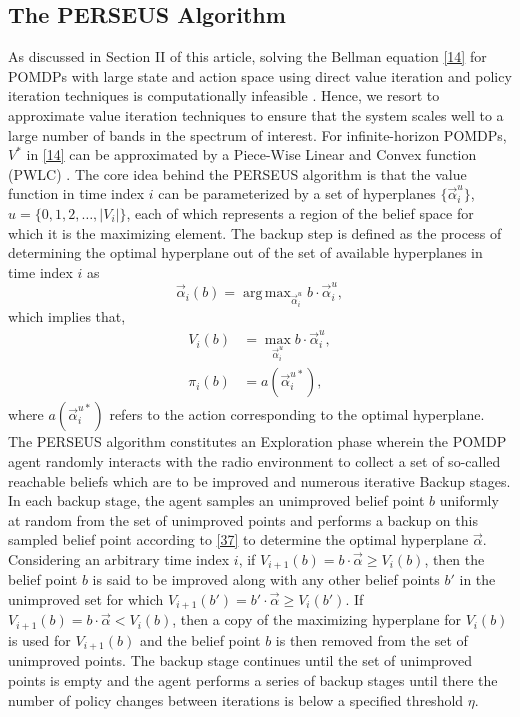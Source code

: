 \documentclass[10pt,twocolumn]{IEEEtran}
\newcommand{\bk}[1]{{\color{red}{[BK: #1]}}}
\DeclareMathOperator*{\argmax}{arg\,max}
\begin{document}
\subsection{The PERSEUS Algorithm}
As discussed in Section II of this article, solving the Bellman equation \eqref{14} for POMDPs with large state and action space using direct value iteration and policy iteration techniques is computationally infeasible \bk{citation}. Hence, we resort to approximate value iteration techniques \bk{citation} to ensure that the system scales well to a large number of bands in the spectrum of interest. For infinite-horizon POMDPs, $V^*$ in \eqref{14} can be approximated by a Piece-Wise Linear and Convex function (PWLC) \bk{citation}. The core idea behind the PERSEUS algorithm is that the value function in time index $i$ can be parameterized by a set of hyperplanes $\{\vec{\alpha}_i^{u}\}$, $u = \{0,1,2,\dots,|V_i|\}$, each of which represents a region of the belief space for which it is the maximizing element. The backup step is defined as the process of determining the optimal hyperplane out of the set of available hyperplanes in time index $i$ as
\begin{equation}\label{37}
    \vec{\alpha}_{i}(b) = \argmax_{\vec{\alpha}_{i}^u} b \cdot \vec{\alpha}_{i}^u,
\end{equation}
which implies that,
\begin{equation}\label{38}
    \begin{split}
        V_i(b) &= \max_{\vec{\alpha}_{i}^u} b \cdot \vec{\alpha}_{i}^u,\\
        \pi_i(b) &= a(\vec{\alpha}_i^{u*}),
    \end{split}
\end{equation}
where $a(\vec{\alpha}_i^{u*})$ refers to the action corresponding to the optimal hyperplane. The PERSEUS algorithm constitutes an Exploration phase wherein the POMDP agent randomly interacts with the radio environment to collect a set of so-called reachable beliefs which are to be improved and numerous iterative Backup stages. In each backup stage, the agent samples an unimproved belief point $b$ uniformly at random from the set of unimproved points and performs a backup on this sampled belief point according to \eqref{37} to determine the optimal hyperplane $\vec{\alpha}$. Considering an arbitrary time index $i$, if $V_{i+1}(b) = b \cdot \vec{\alpha} \geq V_{i}(b)$, then the belief point $b$ is said to be improved along with any other belief points $b'$ in the unimproved set for which $V_{i+1}(b') = b' \cdot \vec{\alpha} \geq V_{i}(b')$. If $V_{i+1}(b) = b \cdot \vec{\alpha} < V_{i}(b)$, then a copy of the maximizing hyperplane for $V_i(b)$ is used for $V_{i+1}(b)$ and the belief point $b$ is then removed from the set of unimproved points. The backup stage continues until the set of unimproved points is empty and the agent performs a series of backup stages until there the number of policy changes between iterations is below a specified threshold $\eta$. \bk{Add the algorithm block!}
\end{document}
